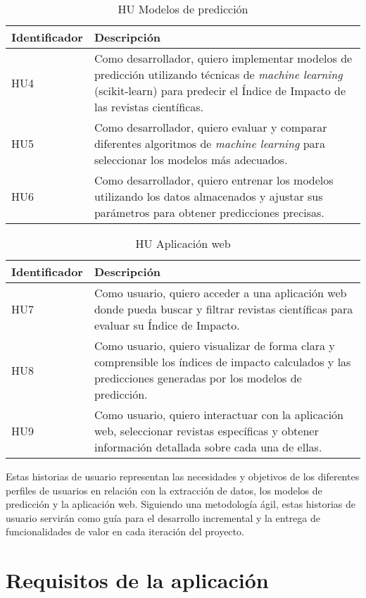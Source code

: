 \begin{table}[h]
\centering
\begin{tabular}{|p{3cm}|p{8cm}|}
\hline
\textbf{Identificador} & \textbf{Descripción} \\
\hline
HU4 & Como desarrollador, quiero implementar modelos de predicción utilizando técnicas de \textit{machine learning} (scikit-learn) para predecir el Índice de Impacto de las revistas científicas. \\
\hline
HU5 & Como desarrollador, quiero evaluar y comparar diferentes algoritmos de \textit{machine learning} para seleccionar los modelos más adecuados. \\
\hline
HU6 & Como desarrollador, quiero entrenar los modelos utilizando los datos almacenados y ajustar sus parámetros para obtener predicciones precisas. \\
\hline
\end{tabular}
\caption{HU Modelos de predicción}
\label{tab:Modelos de predicción}
\end{table}

\begin{table}[h]
\centering
\begin{tabular}{|p{3cm}|p{8cm}|}
\hline
\textbf{Identificador} & \textbf{Descripción} \\
\hline
HU7 & Como usuario, quiero acceder a una aplicación web donde pueda buscar y filtrar revistas científicas para evaluar su Índice de Impacto. \\
\hline
HU8 & Como usuario, quiero visualizar de forma clara y comprensible los índices de impacto calculados y las predicciones generadas por los modelos de predicción. \\
\hline
HU9 & Como usuario, quiero interactuar con la aplicación web, seleccionar revistas específicas y obtener información detallada sobre cada una de ellas. \\
\hline
\end{tabular}
\caption{HU Aplicación web}
\label{tab:Aplicación web}
\end{table}

Estas historias de usuario representan las necesidades y objetivos de los diferentes perfiles de usuarios en relación con la extracción de datos, los modelos de predicción y la aplicación web. Siguiendo una metodología ágil, estas historias de usuario servirán como guía para el desarrollo incremental y la entrega de funcionalidades de valor en cada iteración del proyecto.

\newpage
\section{Requisitos de la aplicación}
\label{sec:Requisitos de aplicación}

